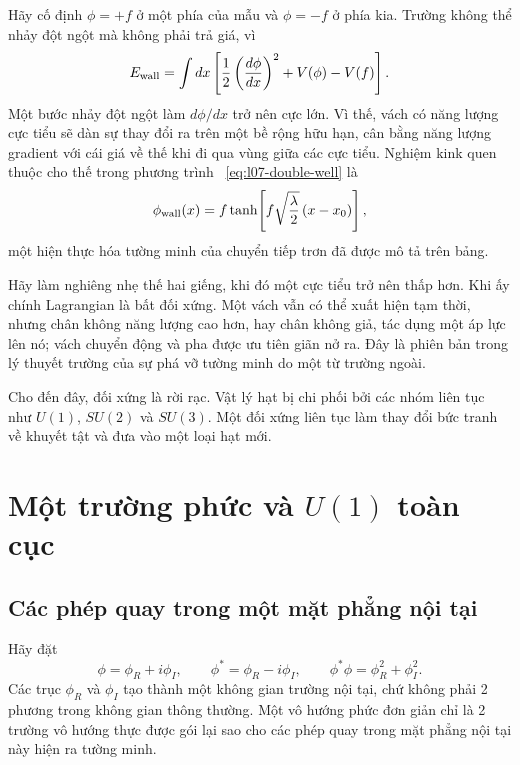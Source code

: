 Hãy cố định \(\phi=+f\) ở một phía của mẫu và \(\phi=-f\) ở phía kia. Trường không thể nhảy đột ngột mà không phải trả giá, vì
\begin{equation}
  E_{\rm wall}
  =\int dx\left[
      \frac12\left(\frac{d\phi}{dx}\right)^2+V(\phi)-V(f)
    \right].
  \label{eq:l07-wall-energy}
\end{equation}
Một bước nhảy đột ngột làm \(d\phi/dx\) trở nên cực lớn. Vì thế, vách có năng lượng cực tiểu sẽ dàn sự thay đổi ra trên một bề rộng hữu hạn, cân bằng năng lượng gradient với cái giá về thế khi đi qua vùng giữa các cực tiểu. Nghiệm kink quen thuộc cho thế trong phương trình ~\eqref{eq:l07-double-well} là
\begin{equation}
  \phi_{\rm wall}(x)
  =f\tanh\!\left[f\sqrt{\frac{\lambda}{2}}\,(x-x_0)\right],
  \label{eq:l07-kink}
\end{equation}
một hiện thực hóa tường minh của chuyển tiếp trơn đã được mô tả trên bảng.

Hãy làm nghiêng nhẹ thế hai giếng, khi đó một cực tiểu trở nên thấp hơn. Khi ấy chính Lagrangian là bất đối xứng. Một vách vẫn có thể xuất hiện tạm thời, nhưng chân không năng lượng cao hơn, hay chân không giả, tác dụng một áp lực lên nó; vách chuyển động và pha được ưu tiên giãn nở ra. Đây là phiên bản trong lý thuyết trường của sự phá vỡ tường minh do một từ trường ngoài.

Cho đến đây, đối xứng là rời rạc. Vật lý hạt bị chi phối bởi các nhóm liên tục như \(U(1)\), \(SU(2)\) và \(SU(3)\). Một đối xứng liên tục làm thay đổi bức tranh về khuyết tật và đưa vào một loại hạt mới.

\section{Một trường phức và \texorpdfstring{\(U(1)\)}{U(1)} toàn cục}

\subsection{Các phép quay trong một mặt phẳng nội tại}

Hãy đặt
\begin{equation}
  \phi=\phi_R+i\phi_I,
  \qquad
  \phi^*=\phi_R-i\phi_I,
  \qquad
  \phi^*\phi=\phi_R^2+\phi_I^2.
  \label{eq:l07-components}
\end{equation}
Các trục \(\phi_R\) và \(\phi_I\) tạo thành một không gian trường nội tại, chứ không phải 2 phương trong không gian thông thường. Một vô hướng phức đơn giản chỉ là 2 trường vô hướng thực được gói lại sao cho các phép quay trong mặt phẳng nội tại này hiện ra tường minh.

